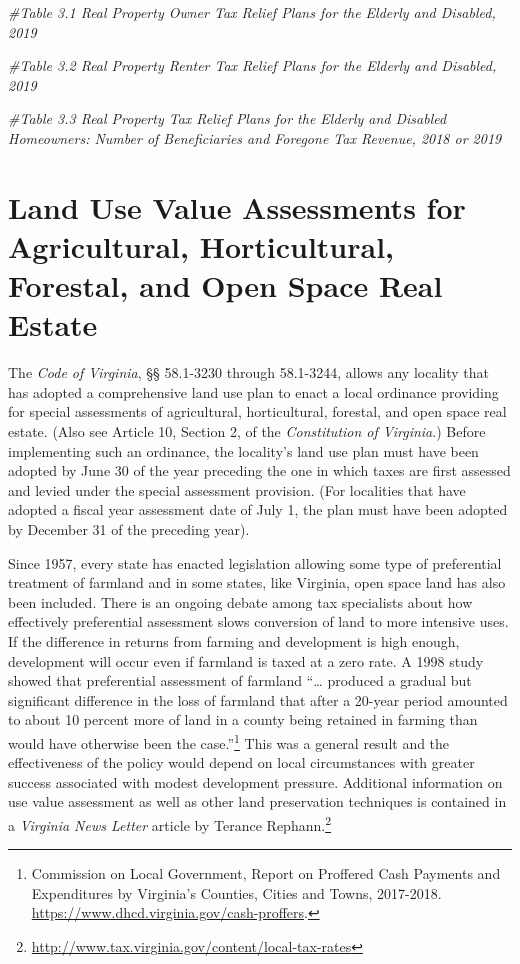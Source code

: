 \documentclass[
]{book}
\newenvironment{Shaded}{\begin{snugshade}}{\end{snugshade}}
\newcommand{\CommentTok}[1]{\textcolor[rgb]{0.56,0.35,0.01}{\textit{#1}}}
\begin{document}
\begin{Shaded}
\begin{Highlighting}[]
\CommentTok{\#Table 3.1 Real Property Owner Tax Relief Plans for the Elderly and Disabled, 2019}

\CommentTok{\#Table 3.2 Real Property Renter Tax Relief Plans for the Elderly and Disabled, 2019}

\CommentTok{\#Table 3.3 Real Property Tax Relief Plans for the Elderly and Disabled Homeowners: Number of Beneficiaries and Foregone Tax Revenue, 2018 or 2019}
\end{Highlighting}
\end{Shaded}

\hypertarget{land-use-value-assessments-for-agricultural-horticultural-forestal-and-open-space-real-estate}{%
\chapter{Land Use Value Assessments for Agricultural, Horticultural, Forestal, and Open Space Real Estate}\label{land-use-value-assessments-for-agricultural-horticultural-forestal-and-open-space-real-estate}}

The \emph{Code of Virginia}, §§ 58.1-3230 through 58.1-3244, allows any locality that has adopted a comprehensive land use plan to enact a local ordinance providing for special assessments of agricultural, horticultural, forestal, and open space real estate. (Also see Article 10, Section 2, of the \emph{Constitution of Virginia}.) Before implementing such an ordinance, the locality's land use plan must have been adopted by June 30 of the year preceding the one in which taxes are first assessed and levied under the special assessment provision. (For localities that have adopted a fiscal year assessment date of July 1, the plan must have been adopted by December 31 of the preceding year).

Since 1957, every state has enacted legislation allowing some type of preferential treatment of farmland and in some states, like Virginia, open space land has also been included. There is an ongoing debate among tax specialists about how effectively preferential assessment slows conversion of land to more intensive uses. If the difference in returns from farming and development is high enough, development will occur even if farmland is taxed at a zero rate. A 1998 study showed that preferential assessment of farmland ``\ldots{} produced a gradual but significant difference in the loss of farmland that after a 20-year period amounted to about 10 percent more of land in a county being retained in farming than would have otherwise been the case.''\footnote{Commission on Local Government, Report on Proffered Cash Payments and Expenditures by Virginia's Counties, Cities and Towns, 2017-2018. \url{https://www.dhcd.virginia.gov/cash-proffers}.} This was a general result and the effectiveness of the policy would depend on local circumstances with greater success associated with modest development pressure. Additional information on use value assessment as well as other land preservation techniques is contained in a \emph{Virginia News Letter} article by Terance Rephann.\footnote{\url{http://www.tax.virginia.gov/content/local-tax-rates}}
\end{document}
